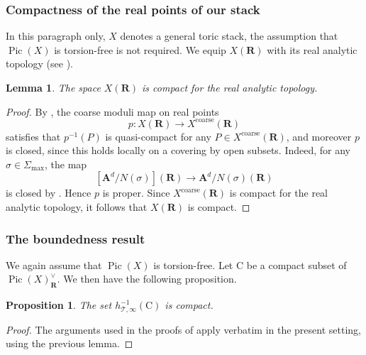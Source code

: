 \documentclass{proc-l}
\newcommand{\R}{\mathbf{R}}
\DeclareMathOperator{\Pic}{Pic}
\DeclareMathOperator{\coarse}{coarse}
\newcommand{\stackT}{\mathcal{T}}
\newcommand{\affine}{\mathbf{A}}
\newtheorem{lemma}[theorem]{Lemma}
\newtheorem{prop}[theorem]{Proposition}
\theoremstyle{definition}
\theoremstyle{remark}
\numberwithin{equation}{section}
\begin{document}
\subsubsection{Compactness of the real points of our stack}

In this paragraph only, $X$ denotes a general toric stack, the assumption that $\Pic(X)$ is torsion-free is not required. We equip $X(\R)$ with its real analytic topology (see
\cite[Definition~7.5]{de_gaay_definition_real_topology}).

\begin{lemma}\label{lemma_compacity_real_points_stacks}
The space $X(\R)$ is compact for the real analytic topology.
\end{lemma}

\begin{proof}
By \cite[Proposition~2.1]{ambrosi2025topologyrealalgebraicstacks}, the coarse moduli map
on real points
\[
p : X(\R) \longrightarrow X^{\coarse}(\R)
\]
satisfies that $p^{-1}(P)$ is quasi-compact for any
$P \in X^{\coarse}(\R)$, and moreover $p$ is closed, since this holds locally on a
covering by open subsets. Indeed, for any $\sigma \in \Sigma_{\max}$, the map
\[
[\affine^{d}/N(\sigma)](\R)
\longrightarrow
\affine^{d}/N(\sigma)(\R)
\]
is closed by \cite[Lemma~4.8]{ambrosi2025topologyrealalgebraicstacks}. Hence $p$ is
proper. Since $X^{\coarse}(\R)$ is compact for the real analytic topology, it follows
that $X(\R)$ is compact.
\end{proof}

\subsubsection{The boundedness result}

We again assume that $\Pic(X)$ is torsion-free. Let $\mathrm{C}$ be a compact subset of
$\Pic(X)^{\vee}_{\R}$. We then have the following proposition.

\begin{prop}\label{prop_appendix_B_upper_bound_non_smooth_case}
The set $h_{\stackT,\infty}^{-1}(\mathrm{C})$ is compact.
\end{prop}

\begin{proof}
The arguments used in the proofs of
\cite[Proposition 3.20, Corollary~3.21, Lemma~4.3]{bongiorno2024multiheightanalysisrationalpoints}
apply verbatim in the present setting, using the previous lemma.
\end{proof}
\end{document}
